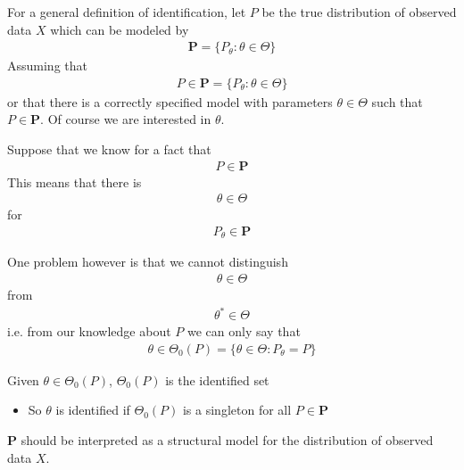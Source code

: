 \documentclass{beamer}
\begin{document}
\begin{frame}
 For a general definition of identification, let $P$ be the true distribution of observed data $X$ which can be modeled by
 \begin{align}
   \mathbf{P} = \{P_{\theta}: \theta \in \Theta  \}
 \end{align}
 \medskip
 Assuming that 
 \begin{align}
   P \in \mathbf{P} = \{P_{\theta}: \theta \in \Theta  \}
 \end{align}
 or that there is a correctly specified model with parameters $\theta \in \Theta$ such that $P \in \mathbf{P}$.
 Of course we are interested in $\theta$.  
\end{frame}

\begin{frame}
  Suppose that we know for a fact that 
  \begin{align}
    P \in \mathbf{P}
  \end{align}
  \medskip
  This means that there is  
  \begin{align}
    \theta \in \Theta
  \end{align}
  for 
  \begin{align}
    P_{\theta} \in \mathbf{P}
  \end{align}
\end{frame}


\begin{frame}
 One problem however is that we cannot distinguish 
 \begin{align}
   \theta \in \Theta
 \end{align}
 from
 \begin{align}
   \theta^* \in \Theta
 \end{align}
 \medskip
 i.e. from our knowledge about $P$ we can only say that 
  \begin{align}
    \theta \in \Theta_0(P)= \{\theta \in \Theta: P_{\theta} = P\}
  \end{align}
\end{frame}

\begin{frame}
 Given $\theta \in \Theta_0(P)$, $\Theta_0(P)$ is the identified set    
  \begin{itemize}
    \item So $\theta$ is identified if $\Theta_0 (P)$ is a singleton for all $P \in \mathbf{P}$
  \end{itemize} 
  \medskip
  $\mathbf{P}$ should be interpreted as a structural model for the distribution of observed data $X$.
\end{frame}
\end{document}
